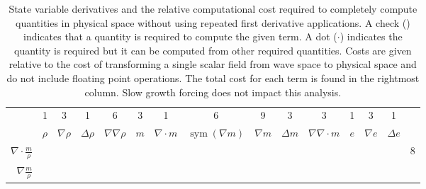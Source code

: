 \documentclass[letterpaper,11pt,nointlimits,reqno,draft]{amsbook}
\newcommand{\symmetricpart}[1]
  {\ensuremath{\operatorname{sym}\left(#1\right)}}
\begin{document}
\begin{table}[p]
\centering
\caption{
    State variable derivatives and the relative computational cost required to
    completely compute quantities in physical space without using repeated
    first derivative applications.  A check (\checkmark) indicates that a
    quantity is required to compute the given term.  A dot ($\cdot$) indicates
    the quantity is required but it can be computed from other required
    quantities.  Costs are given relative to the cost of transforming a single
    scalar field from wave space to physical space and do not include floating
    point operations. The total cost for each term is found in the rightmost
    column. Slow growth forcing does not impact this analysis.
}
\label{tab:nofirstderivnonlinearcost}
\renewcommand{\arraystretch}{1.40}   %
\newcommand{\cm}{\checkmark}         %
\newcommand{\cd}{\ensuremath{\cdot}} %
\begin{tabular}{r|cccc|cccccc|ccc|r}
&   1 &   3 &   1 &   6 &   3 &   1 &   6 &   9 &   3 &   3 &   1 &   3 &   1
\\
& $\rho$                                              %
& $\nabla\rho$                                        %
& $\Delta\rho$                                        %
& $\nabla\nabla\rho$                                  %
& $m$                                                 %
& $\nabla\cdot{}m$                                    %
& $\symmetricpart{\nabla{}m}$                         %
& $\nabla{}m$                                         %
& $\Delta{}m$                                         %
& $\nabla\nabla\cdot{}m$                              %
& $e$                                                 %
& $\nabla{}e$                                         %
& $\Delta{}e$                                         %
\\ \hline
$\nabla\cdot\frac{m}{\rho}$
& \cm & \cm &     &     & \cm & \cm &     &     &     &     &     &     &
& 8 \\
$\nabla\frac{m}{\rho}$
& \cm & \cm &     &     & \cm &     &     & \cm &     &     &     &     &

\end{tabular}
\end{table}
\end{document}
